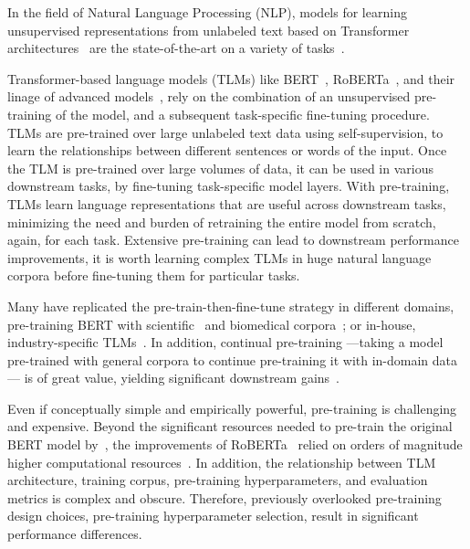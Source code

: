 In the field of Natural Language Processing (NLP),
models for learning unsupervised representations from unlabeled text based on Transformer architectures~\citep{vaswani2017attention}
are the state-of-the-art on a variety of tasks~\citep{kalyan2021ammus}.

Transformer-based language models (TLMs) like BERT~\citep{bert}, RoBERTa~\citep{roberta},
and their linage of advanced models~\citep{Amatriain2023},
rely on the combination of an unsupervised pre-training of the model, and a subsequent task-specific fine-tuning procedure. 
%
TLMs are pre-trained over large unlabeled text data using self-supervision, 
to learn the relationships between different sentences or words of the input.
Once the TLM is pre-trained over large volumes of data, it can be used in various downstream tasks, by fine-tuning task-specific model layers.
%
With pre-training, TLMs learn language representations
that are useful across downstream tasks,
minimizing the need and burden of retraining the entire model from scratch, again, for each task.
Extensive pre-training can lead to downstream performance improvements, \ie it is worth learning complex TLMs in huge natural language corpora before fine-tuning them for particular tasks. 

Many have replicated the pre-train-then-fine-tune strategy in different domains,
\eg pre-training BERT with scientific~\citep{j-Beltagy2019}
and biomedical corpora~\citep{j-Lee2020,j-Alsentzer2019,j-Gu2021};
or in-house, industry-specific TLMs~\citep{kalyan2021ammus}. %
%
In addition, continual pre-training
---taking a model pre-trained with general corpora to continue pre-training it with in-domain data---
is of great value,
yielding significant downstream gains~\citep{j-Gururangan2020}.

Even if conceptually simple and empirically powerful, pre-training is challenging and expensive.
Beyond the significant resources needed to pre-train the original BERT model by~\citet{bert},
the improvements of RoBERTa~\citep{roberta} relied on orders of magnitude higher computational resources~\citep{j-kaplan2020}.
In addition, the relationship between TLM architecture,
training corpus, pre-training hyperparameters, and evaluation metrics is complex and obscure. 
Therefore, previously overlooked pre-training design choices,
\eg pre-training hyperparameter selection,
result in significant performance differences.

